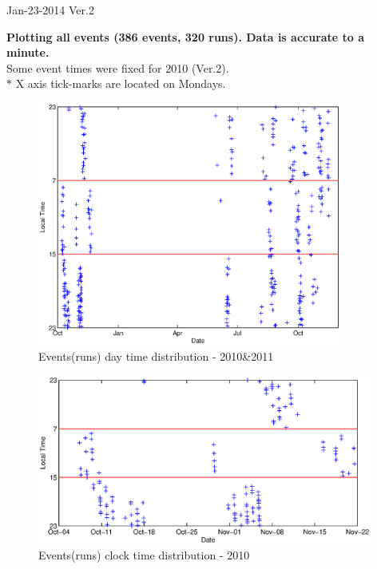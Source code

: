 \documentclass[a4paper,11pt]{article}
\begin{document}
\pagestyle{empty}

\begin{rightline}
{Jan-23-2014 Ver.2}
\end{rightline}


\noindent
\textbf{Plotting all events (386 events, 320 runs). Data is accurate to a minute.}\\

\noindent
Some event times were fixed for 2010 (Ver.2).\\
$\ast$ X axis tick-marks are located on Mondays.

\begin{figure}[htbp]
\begin{center}
\includegraphics[width =10cm]{PlotTime.eps}
\caption{Events(runs) day time distribution - 2010\&2011}
\end{center}
\label{twoyears}
\end{figure}

\begin{figure}[htbp]
\begin{center}
\includegraphics[width =11cm]{PlotTime2010.eps}
\caption{Events(runs) clock time distribution - 2010}
\end{center}
\label{2010}
\end{figure}
\end{document}
